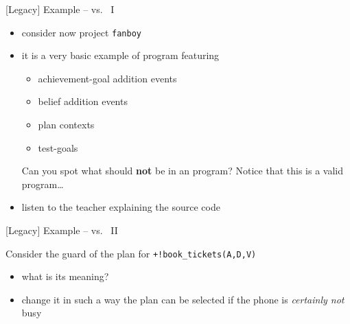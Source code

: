 \documentclass[presentation]{beamer}\mode<presentation>{\usetheme{AMSBolognaFC}}
\begin{document}
\begin{frame}[c]{[Legacy] Example -- \agentspeakl{} vs.\ \jason{} I}
    \begin{itemize}
        \item consider now project \alert{\texttt{fanboy}}
        \vfill
        \item it is a very basic example of \agentspeakl{} program featuring
        \begin{itemize}
            \item achievement-goal addition events
            \item belief addition events
            \item plan contexts
            \item test-goals
        \end{itemize}
        \vfill
        \begin{block}{Can you spot what should \textbf{not} be in an \agentspeakl{} program?}
            Notice that this is a valid \jason{} program\ldots{}
        \end{block}
        \vfill
        \item listen to the teacher explaining the source code
    \end{itemize}
\end{frame} 

\begin{frame}[c]{[Legacy] Example -- \agentspeakl{} vs.\ \jason{} II}
    
    \begin{block}{Consider the guard of the plan for \texttt{+!book\_tickets(A,D,V)}}
        \begin{itemize}
            \item what is its meaning?
            \item change it in such a way the plan can be selected if the phone is \alert{\emph{certainly not}} busy
        \end{itemize}
    \end{block}
\end{frame} 
\end{document}
